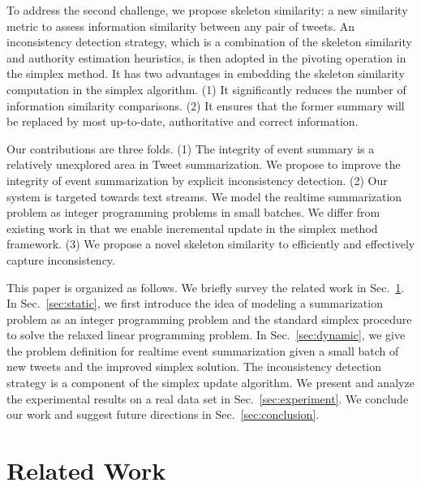 \documentclass[envcountsame]{llncs}
\begin{document}
To address the second challenge, we propose skeleton similarity: a new similarity metric to assess information similarity between any pair of tweets. An inconsistency detection strategy, which is a combination of the skeleton similarity and authority estimation heuristics, is then adopted in the pivoting operation in the simplex method. It has two advantages in embedding the skeleton similarity computation in the simplex algorithm. (1) It significantly reduces the number of information similarity comparisons. (2) It ensures that the former summary will be replaced by most up-to-date, authoritative and correct information.

Our contributions are three folds. (1) The integrity of event summary is a relatively unexplored area in Tweet summarization. We propose to improve the integrity of event summarization by explicit inconsistency detection. (2) Our system is targeted towards text streams. We model the realtime summarization problem as integer programming problems in small batches. We differ from existing work in that we enable incremental update in the simplex method framework. (3) We propose a novel skeleton similarity to efficiently and effectively capture inconsistency.

This paper is organized as follows. We briefly survey the related work in Sec.~\ref{sec:related}. In Sec.~\ref{sec:static}, we first introduce the idea of modeling a summarization problem as an integer programming problem and the standard simplex procedure to solve the relaxed linear programming problem. In Sec.~\ref{sec:dynamic}, we give the problem definition for realtime event summarization given a small batch of new tweets and the improved simplex solution. The inconsistency detection strategy is a component of the simplex update algorithm. We present and analyze the experimental results on a real data set in Sec.~\ref{sec:experiment}. We conclude our work and suggest future directions in Sec.~\ref{sec:conclusion}.

\section{Related Work}\label{sec:related}
\end{document}
